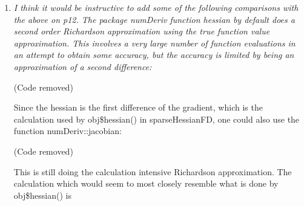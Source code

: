 \documentclass{article}
\newcommand{\code}[1]{\texttt{#1}}
\newcommand{\func}[1]{\code{#1}}
\newcommand{\class}[1]{\textsl{#1}}
\newenvironment{revQuote}{\itshape}{\vspace{\baselineskip}}
\newenvironment{response}{\normalfont}{\vspace{\baselineskip}}
\begin{document}
\begin{enumerate}[align=left]
\begin{revQuote}
(Code removed)


It is not clear to me whether obj\$fn() and obj\$gr() use code as in the true
functions or a modified version using sparse techniques. Some further
clarification would be helpful.

On the other hand, all.equal(hs, true.hess) is comparing a true analytic
calculation with a first order simple difference aproximation using the true
gradient function:

(Code removed)

which might also be mentioned in the text. (Really just for exposition
purposes, after all, it is almost the main purpose of the package.)
  \end{revQuote}

\begin{response}
  Good point.  I revised that section to explain that evaluations of
  the function and gradient, as called from the
  \class{sparseHessianFD} object, have to be identical to the true values.
  I replaced \func{all.equal} with \func{identical} to
  highlight that fact. I then explain that the
  \class{sparseHessianFD} calculation of the Hessian will not be
  identical to the true value, and report the mean relative
  difference.  I chose the mean relative difference over maximum
  absolute difference to be consistent with what \func{all.equal}
  uses to test if two matrices are equal within numeric tolerance.
\end{response}


\item \label{it:complex1}\begin{revQuote}
I think it would be instructive to add some of the following comparisons
with the above on p12.  The package numDeriv function hessian by default
does a second order Richardson approximation using the true function value
approximation. This involves a very large number of function evaluations in
an attempt to obtain some accuracy, but the accuracy is limited by being an
approximation of a second difference:

(Code removed)

Since the hessian is the first difference of the gradient, which is the
calculation used by obj\$hessian() in sparseHessianFD, one could also use the
function numDeriv::jacobian:

(Code removed)

This is still doing the calculation intensive Richardson approximation. The
calculation which would seem to most closely resemble what is done by
obj\$hessian() is


\end{revQuote}
\end{enumerate}
\end{document}
